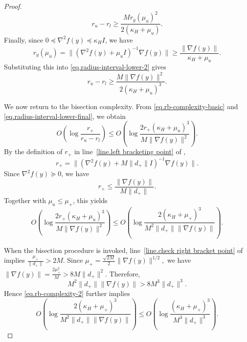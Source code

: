 \documentclass{article}
\numberwithin{equation}{section}
\numberwithin{equation}{section}
\begin{document}
\begin{proof}
\begin{equation}
        \label{eq.radius-interval-lower-2}
        r_u-r_l
        \ge
        \frac{M r_y(\mu_u)^2}{2(\kappa_H+\mu_u)}.
    \end{equation}
    Finally, since \(0\preceq \nabla^2 f(y)\preceq \kappa_H I\), we have
    \[
        r_y(\mu_u)
        =
        \|(\nabla^2 f(y)+\mu_u I)^{-1}\nabla f(y)\|
        \ge
        \frac{\|\nabla f(y)\|}{\kappa_H+\mu_u}.
    \]
    Substituting this into \eqref{eq.radius-interval-lower-2} gives
    \begin{equation}
        \label{eq.radius-interval-lower-final}
        r_u-r_l
        \ge
        \frac{M\|\nabla f(y)\|^2}{2(\kappa_H+\mu_u)^3}.
    \end{equation}

    We now return to the bisection complexity. From \eqref{eq.rb-complexity-basic}
    and \eqref{eq.radius-interval-lower-final}, we obtain
    \begin{equation}
        \label{eq.rb-complexity-1}
        O\left(
        \log\frac{r_+}{r_u-r_l}
        \right)
        \le
        O\left(
        \log
        \frac{
                2r_+(\kappa_H+\mu_u)^3
            }{
                M\|\nabla f(y)\|^2
            }
        \right).
    \end{equation}
    By the definition of \(r_+\) in line~\ref{line.left bracketing point} of
    ,
    \[
        r_+
        =
        \|(\nabla^2 f(y)+M\|d_+\|I)^{-1}\nabla f(y)\|.
    \]
    Since \(\nabla^2 f(y)\succeq0\), we have
    \[
        r_+
        \le
        \frac{\|\nabla f(y)\|}{M\|d_+\|}.
    \]
    Together with \(\mu_u\le\mu_+\), this yields
    \begin{equation}
        \label{eq.rb-complexity-2}
        O\left(
        \log
        \frac{
                2r_+(\kappa_H+\mu_u)^3
            }{
                M\|\nabla f(y)\|^2
            }
        \right)
        \le
        O\left(
        \log
        \frac{
                2(\kappa_H+\mu_+)^3
            }{
                M^2\|d_+\|\|\nabla f(y)\|
            }
        \right).
    \end{equation}

    When the bisection procedure is invoked, line~\ref{line.check right bracket point}
    of  implies
    \(
    \frac{\mu_+}{\|d_+\|}>2M.
    \)
    Since
    \(
    \mu_+
    =
    \frac{\sqrt{2M}}{2}\|\nabla f(y)\|^{1/2},
    \)
    we have
    \(
    \|\nabla f(y)\|
    =
    \frac{2\mu_+^2}{M}
    >
    8M\|d_+\|^2.
    \)
    Therefore,
    \[
        M^2\|d_+\|\|\nabla f(y)\|
        >
        8M^3\|d_+\|^3.
    \]
    Hence \eqref{eq.rb-complexity-2} further implies
    \begin{equation}
        \label{eq.rb-complexity-3}
        O\left(
        \log
        \frac{
                2(\kappa_H+\mu_+)^3
            }{
                M^2\|d_+\|\|\nabla f(y)\|
            }
        \right)
        \le
        O\left(
        \log
        \frac{
                (\kappa_H+\mu_+)^3
            }{
                M^3\|d_+\|^3
            }
        \right).
    \end{equation}


\end{proof}
\end{document}
